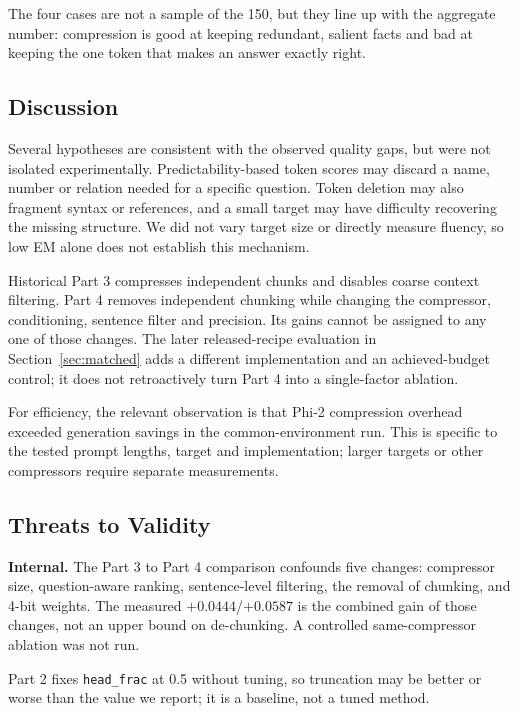 ﻿\documentclass[10pt,a4paper,twocolumn]{article}
\begin{document}
The four cases are not a sample of the 150, but they line up with the aggregate
number: compression is good at keeping redundant, salient facts and bad at keeping
the one token that makes an answer exactly right.

\subsection{Discussion}
\label{sec:discussion}

Several hypotheses are consistent with the observed quality gaps, but were
not isolated experimentally. Predictability-based token scores may discard a
name, number or relation needed for a specific question. Token deletion may also
fragment syntax or references, and a small target may have difficulty recovering
the missing structure. We did not vary target size or directly measure fluency,
so low EM alone does not establish this mechanism.

Historical Part 3 compresses independent chunks and disables coarse context
filtering. Part 4 removes independent chunking while changing the compressor,
conditioning, sentence filter and precision. Its gains cannot be assigned to any
one of those changes. The later released-recipe evaluation in
Section~\ref{sec:matched} adds a different implementation and an achieved-budget
control; it does not retroactively turn Part 4 into a single-factor ablation.

For efficiency, the relevant observation is that Phi-2 compression overhead
exceeded generation savings in the common-environment run. This is specific to
the tested prompt lengths, target and implementation; larger targets or other
compressors require separate measurements.

\subsection{Threats to Validity}
\label{sec:threats}

\textbf{Internal.} The Part 3 to Part 4 comparison confounds five changes:
compressor size, question-aware ranking, sentence-level filtering, the removal of
chunking, and 4-bit weights. The measured $+0.0444$/$+0.0587$ is the combined gain of those changes,
not an upper bound on de-chunking. A controlled same-compressor ablation was not
run.

Part 2 fixes
\texttt{head\_frac} at 0.5 without tuning, so truncation may be better or worse
than the value we report; it is a baseline, not a tuned method.
\end{document}

